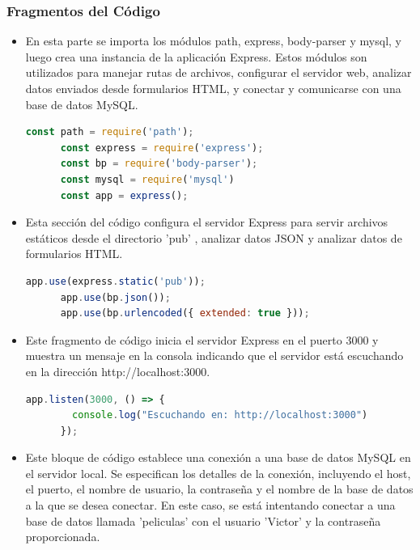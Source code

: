 \documentclass{article}
\begin{document}
  \subsubsection{Fragmentos del Código}
  \begin{itemize}
    \item En esta parte se importa los módulos path, express, body-parser y mysql, y luego crea una instancia de la 
      aplicación Express. Estos módulos son utilizados para manejar rutas de archivos, configurar el servidor web, 
      analizar datos enviados desde formularios HTML, y conectar y comunicarse con una base de datos MySQL.
    \begin{lstlisting}[language=JavaScript,caption=Importación]
      const path = require('path');
      const express = require('express');
      const bp = require('body-parser');
      const mysql = require('mysql')
      const app = express();
    \end{lstlisting}
    \item Esta sección del código configura el servidor Express para servir archivos estáticos desde el directorio 'pub'
      , analizar datos JSON y analizar datos de formularios HTML.
    \begin{lstlisting}[language=JavaScript,caption=Configuración,firstnumber=7]
      app.use(express.static('pub'));
      app.use(bp.json());
      app.use(bp.urlencoded({ extended: true }));
    \end{lstlisting}
    \item Este fragmento de código inicia el servidor Express en el puerto 3000 y muestra un mensaje en la consola 
      indicando que el servidor está escuchando en la dirección http://localhost:3000.
    \begin{lstlisting}[language=JavaScript,caption=Servidor Inicial,firstnumber=12]
      app.listen(3000, () => {
        console.log("Escuchando en: http://localhost:3000")
      });
    \end{lstlisting}
    \item Este bloque de código establece una conexión a una base de datos MySQL en el servidor local. 
      Se especifican los detalles de la conexión, incluyendo el host, el puerto, el nombre de usuario, la contraseña 
      y el nombre de la base de datos a la que se desea conectar. En este caso, se está intentando conectar a una base de 
      datos llamada 'peliculas' con el usuario 'Victor' y la contraseña proporcionada.
    \begin{lstlisting}[language=JavaScript,caption=conexion mySQL,firstnumber=20]

\end{lstlisting}
\end{itemize}
\end{document}
